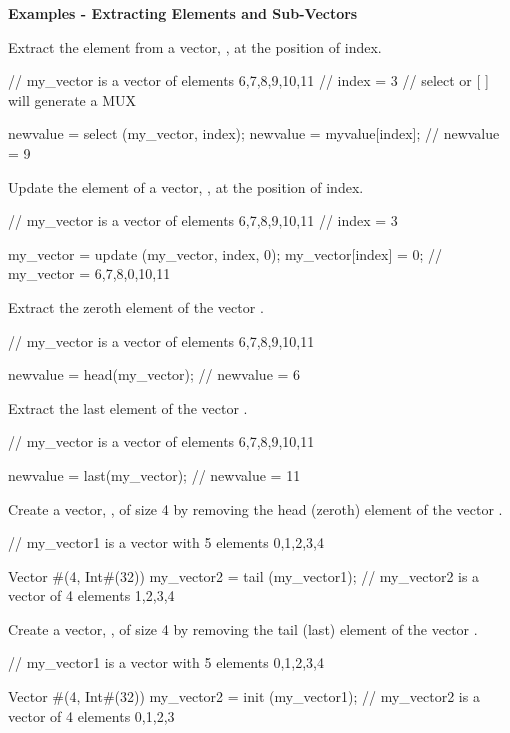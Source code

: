 {\bf Examples - Extracting Elements and Sub-Vectors}

Extract the element from a vector, , at the position of index.
\begin{libverbatim}
     // my_vector is a vector of elements {6,7,8,9,10,11}
     // index = 3
     // select or [ ] will generate a MUX
    
     newvalue = select (my_vector, index);
     newvalue = myvalue[index];
     // newvalue = 9
\end{libverbatim}


Update the element of a vector, , at the position of index.
\begin{libverbatim}
     // my_vector is a vector of elements {6,7,8,9,10,11}
     // index = 3

     my_vector = update (my_vector, index, 0);
     my_vector[index] = 0;
     // my_vector = {6,7,8,0,10,11}
\end{libverbatim}

Extract the zeroth element of the vector .
\begin{libverbatim}
     // my_vector is a vector of elements {6,7,8,9,10,11}

     newvalue = head(my_vector);
     // newvalue = 6
\end{libverbatim} 

Extract the last element of the vector .
\begin{libverbatim}
     // my_vector is a vector of elements {6,7,8,9,10,11}

     newvalue = last(my_vector);
     // newvalue = 11 
\end{libverbatim}

Create a vector, ,  of size 4 by removing the head (zeroth)
element of the vector .
\begin{libverbatim}
     // my_vector1 is a vector with 5 elements {0,1,2,3,4}

     Vector #(4, Int#(32)) my_vector2 = tail (my_vector1);
     // my_vector2 is a vector of 4 elements {1,2,3,4}
\end{libverbatim}

Create a vector, ,  of size 4 by removing the tail (last)
element of the vector .
\begin{libverbatim}
     // my_vector1 is a vector with 5 elements {0,1,2,3,4}

     Vector #(4, Int#(32)) my_vector2 = init (my_vector1);
     // my_vector2 is a vector of 4 elements {0,1,2,3}
\end{libverbatim}

